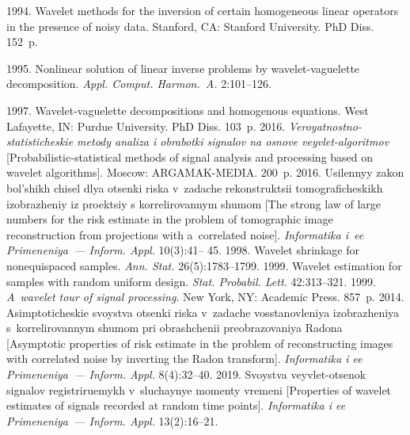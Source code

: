  \begin{multicols}{2}

\renewcommand{\bibname}{\protect\rmfamily References}

{\small\frenchspacing
 {%
 \begin{thebibliography}{99}


 1994. Wavelet methods for the inversion of certain homogeneous linear 
operators in the presence of noisy data. 
 Stanford, CA: Stanford University.  PhD Diss. 152~p. 
 
 1995. Nonlinear solution of linear inverse problems by wavelet-vaguelette 
decomposition. \textit{Appl. Comput. Harmon.~A.} 
 2:101--126.
 
 1997. Wavelet-vaguelette decompositions and homogenous 
equations.  West 
Lafayette, IN: Purdue University.  PhD Diss. 103~p.
 2016. \textit{Veroyatnostno-statisticheskie metody analiza i obrabotki signalov 
na osnove veyvlet-algoritmov} [Probabilistic-statistical methods of signal analysis and processing based 
on wavelet algorithms]. Moscow: ARGAMAK-MEDIA. 200~p.
 2016. Usilennyy zakon bol'shikh chisel dlya otsenki riska v~zadache 
rekonstruktsii to\-mo\-gra\-fi\-che\-skikh izobrazheniy iz proektsiy s korrelirovannym shumom [The strong law 
of large numbers for the risk estimate in the problem of tomographic image 
reconstruction from 
projections with a~correlated noise]. \textit{Informatika i~ee Primeneniya~--- Inform. Appl.} 10(3):41--
45.
 1998. Wavelet shrinkage for nonequispaced samples. \textit{ Ann. 
Stat.} 26(5):1783--1799.
 1999. Wavelet estimation for samples with random uniform design. 
\textit{Stat. Probabil. Lett.} 42:313--321.
 1999. \textit{A~wavelet tour of signal processing}. New York, NY: Academic Press. 
857~p.
 2014. Asimp\-to\-ti\-che\-skie svoystva otsenki riska 
v~zadache vos\-sta\-nov\-le\-niya izob\-ra\-zhe\-niya s~korrelirovannym shumom pri 
obrashchenii preobrazovaniya 
Radona [Asymptotic properties of risk estimate in the problem of reconstructing images with correlated 
noise by inverting the Radon transform]. \textit{Informatika i ee Primeneniya~--- Inform. Appl.} 
8(4):32--40.
 2019. Svoystva veyvlet-otsenok signalov registriruemykh v~sluchaynye 
momenty vremeni [Properties of wavelet estimates of signals recorded at random time points]. 
\textit{Informatika i ee Primeneniya~--- Inform. Appl.} 13(2):16--21.


\end{thebibliography}}}
\end{multicols}
